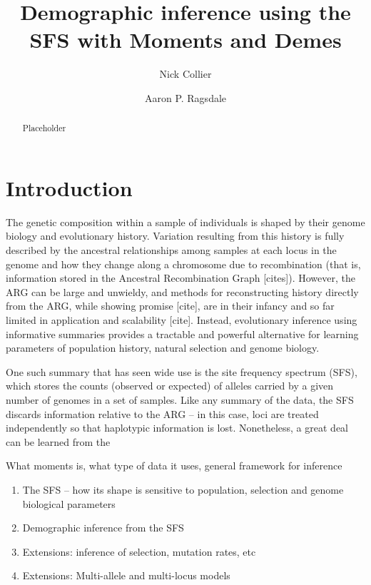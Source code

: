 \documentclass[]{article}
\begin{document}
\title{Demographic inference using the SFS with Moments and Demes}
\author[1]{Nick Collier}
\author[1,*]{Aaron P. Ragsdale}
\maketitle

\begin{abstract}
    Placeholder
\end{abstract}

\section{Introduction}

The genetic composition within a sample of individuals is shaped by their
genome biology and evolutionary history. Variation resulting from this history
is fully described by the ancestral relationships among samples at each locus
in the genome and how they change along a chromosome due to recombination (that
is, information stored in the Ancestral Recombination Graph [cites]). However,
the ARG can be large and unwieldy, and methods for reconstructing history
directly from the ARG, while showing promise [cite], are in their infancy and
so far limited in application and scalability [cite]. Instead, evolutionary
inference using informative summaries provides a tractable and powerful
alternative for learning parameters of population history, natural selection and
genome biology.

One such summary that has seen wide use is the site frequency spectrum (SFS),
which stores the counts (observed or expected) of alleles carried by a given
number of genomes in a set of samples. Like any summary of the data, the SFS
discards information relative to the ARG -- in this case, loci are treated
independently so that haplotypic information is lost. Nonetheless, a great deal
can be learned from the 

What moments is, what type of data it uses, general framework for inference
\begin{enumerate}
    \item The SFS -- how its shape is sensitive to population,
        selection and genome biological parameters
    \item Demographic inference from the SFS
    \item Extensions: inference of selection, mutation rates, etc
    \item Extensions: Multi-allele and multi-locus models
\end{enumerate}
\end{document}
